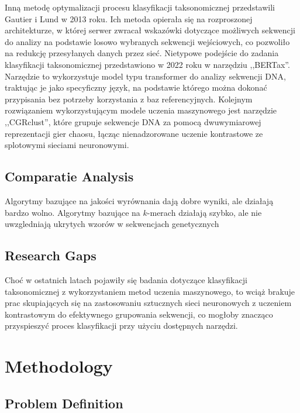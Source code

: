 \documentclass{article}
\newcommand{\temporary}[1]{
    \begin{tcolorbox}[colframe=red, colback=white, title={\textbf{WERSJA PO POLSKU}}, sharp corners=south]
        #1
    \end{tcolorbox}
}
\begin{document}
{        Inną metodę optymalizacji procesu klasyfikacji taksonomicznej przedstawili Gautier i Lund w 2013 roku\cite{Gautier:2013}. Ich metoda opierała się na rozproszonej architekturze, w której serwer zwracał wskazówki dotyczące możliwych sekwencji do analizy na podstawie losowo wybranych sekwencji wejściowych, co pozwoliło na redukcję przesyłanych danych przez sieć. Nietypowe podejście do zadania klasyfikacji taksonomicznej przedstawiono w 2022 roku w narzędziu ,,BERTax''\cite{Mock:2022}. Narzędzie to wykorzystuje model typu transformer\cite{Transformers} do analizy sekwencji DNA, traktując je jako specyficzny język, na podstawie którego można dokonać przypisania bez potrzeby korzystania z baz referencyjnych. Kolejnym rozwiązaniem wykorzystującym modele uczenia maszynowego jest narzędzie ,,CGRclust''\cite{Alipour:2024}, które grupuje sekwencje DNA za pomocą dwuwymiarowej reprezentacji gier chaosu, łącząc nienadzorowane uczenie kontrastowe ze splotowymi sieciami neuronowymi.
            }

        \subsection{Comparatie Analysis}

            \temporary{
                Algorytmy bazujące na jakości wyrównania dają dobre wyniki, ale działają bardzo wolno.
                Algorytmy bazujące na $k$-merach działają szybko, ale nie uwzgledniają ukrytych wzorów w sekwencjach genetycznych
            }

        \subsection{Research Gaps}

            \temporary{
                Choć w ostatnich latach pojawiły się badania dotyczące klasyfikacji taksonomicznej z wykorzystaniem metod uczenia maszynowego, to wciąż brakuje prac skupiających się na zastosowaniu sztucznych sieci neuronowych z uczeniem kontrastowym do efektywnego grupowania sekwencji, co mogłoby znacząco przyspieszyć proces klasyfikacji przy użyciu dostępnych narzędzi.
            }

    \clearpage
    \section{Methodology}

        \subsection{Problem Definition}
\end{document}
